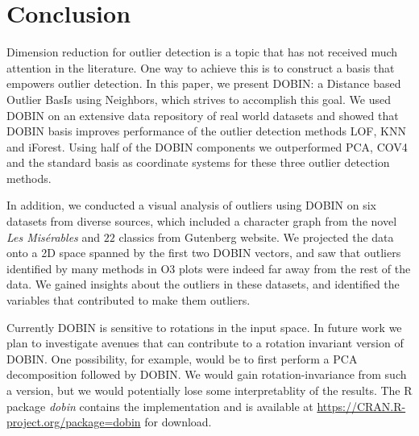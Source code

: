 \documentclass[letter,12pt]{article}
\begin{document}


\section{Conclusion}
Dimension reduction for outlier detection is a topic that has not received much attention in the literature. One way to achieve this is to construct a basis that empowers outlier detection. In this paper, we present DOBIN: a Distance based Outlier BasIs using Neighbors, which strives to accomplish this goal. We used DOBIN on an extensive data repository of real world datasets and showed that DOBIN basis improves performance of the outlier detection methods LOF, KNN and iForest. Using half of the DOBIN components we outperformed PCA, {\color{blue} COV4}  and the standard basis as coordinate systems for these three outlier detection methods.

In addition, we conducted a visual analysis of outliers using DOBIN on six datasets from diverse sources, which included a character graph from the novel \textit{Les Mis\'erables} and $22$ classics from Gutenberg website. We projected the data onto a 2D space spanned by the first two DOBIN vectors, and saw that outliers identified by many methods in O3 plots were indeed far away from the rest of the data. We gained insights about the outliers in these datasets, and identified the variables that contributed to make them outliers.


Currently DOBIN is sensitive to rotations in the input space. In future work we plan to investigate avenues that can contribute to a rotation invariant version of DOBIN. One possibility, for example, would be to first perform a PCA decomposition followed by DOBIN. We would gain rotation-invariance from such a version, but we would potentially lose some interpretablity of the results. The R package \textit{dobin} contains the implementation and is available at \url{https://CRAN.R-project.org/package=dobin} for download.

\clearpage
\end{document}
